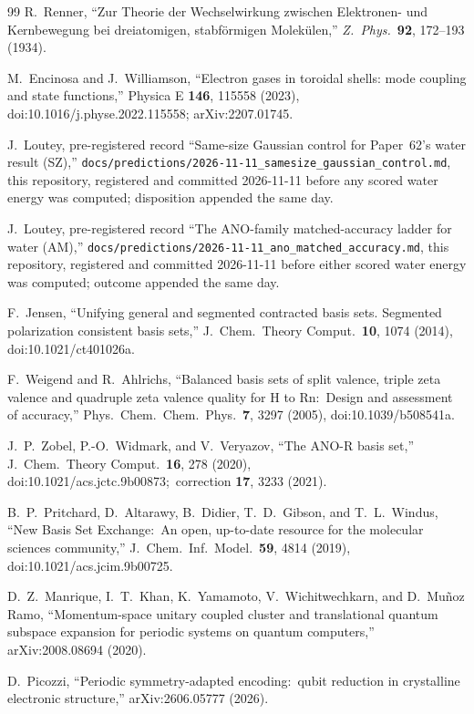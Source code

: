 \documentclass[aps,pra,twocolumn,superscriptaddress,longbibliography]{revtex4-2}
\begin{document}
\begin{thebibliography}{99}
R.~Renner, ``Zur Theorie der Wechselwirkung zwischen Elektronen- und
Kernbewegung bei dreiatomigen, stabf\"ormigen Molek\"ulen,''
\textit{Z.~Phys.}\ \textbf{92}, 172--193 (1934).

M.~Encinosa and J.~Williamson, ``Electron gases in toroidal shells: mode
coupling and state functions,'' Physica E \textbf{146}, 115558 (2023),
doi:10.1016/j.physe.2022.115558; arXiv:2207.01745.

J.~Loutey, pre-registered record ``Same-size Gaussian control for
Paper~62's water result (SZ),''
\texttt{docs/predictions/2026-11-11\_samesize\_gaussian\_control.md},
this repository, registered and committed 2026-11-11 before any scored
water energy was computed; disposition appended the same day.

J.~Loutey, pre-registered record ``The ANO-family matched-accuracy
ladder for water (AM),''
\texttt{docs/predictions/2026-11-11\_ano\_matched\_accuracy.md}, this
repository, registered and committed 2026-11-11 before either scored
water energy was computed; outcome appended the same day.

F.~Jensen, ``Unifying general and segmented contracted basis sets.
Segmented polarization consistent basis sets,'' J.\ Chem.\ Theory
Comput.\ \textbf{10}, 1074 (2014), doi:10.1021/ct401026a.

F.~Weigend and R.~Ahlrichs, ``Balanced basis sets of split valence,
triple zeta valence and quadruple zeta valence quality for H to Rn:\
Design and assessment of accuracy,'' Phys.\ Chem.\ Chem.\ Phys.\
\textbf{7}, 3297 (2005), doi:10.1039/b508541a.

J.~P.~Zobel, P.-O.~Widmark, and V.~Veryazov, ``The ANO-R basis set,''
J.\ Chem.\ Theory Comput.\ \textbf{16}, 278 (2020),
doi:10.1021/acs.jctc.9b00873;\ correction \textbf{17}, 3233 (2021).

\bibitem{pritchard2019}
B.~P.~Pritchard, D.~Altarawy, B.~Didier, T.~D.~Gibson, and
T.~L.~Windus, ``New Basis Set Exchange:\ An open, up-to-date resource
for the molecular sciences community,'' J.\ Chem.\ Inf.\ Model.\
\textbf{59}, 4814 (2019), doi:10.1021/acs.jcim.9b00725.

\bibitem{manrique2020}
D.~Z.~Manrique, I.~T.~Khan, K.~Yamamoto, V.~Wichitwechkarn, and
D.~Mu\~noz Ramo, ``Momentum-space unitary coupled cluster and
translational quantum subspace expansion for periodic systems on quantum
computers,'' arXiv:2008.08694 (2020).

\bibitem{picozzi2026}
D.~Picozzi, ``Periodic symmetry-adapted encoding:\ qubit reduction in
crystalline electronic structure,'' arXiv:2606.05777 (2026).

\end{thebibliography}
\end{document}
